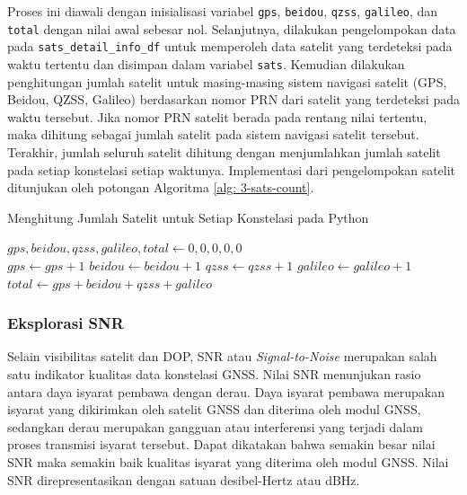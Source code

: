 Proses ini diawali dengan inisialisasi variabel \texttt{gps}, \texttt{beidou}, \texttt{qzss}, \texttt{galileo}, dan \texttt{total} dengan nilai awal sebesar nol. Selanjutnya, dilakukan pengelompokan data pada \texttt{sats\_detail\_info\_df} untuk memperoleh data satelit yang terdeteksi pada waktu tertentu dan disimpan dalam variabel \texttt{sats}. Kemudian dilakukan penghitungan jumlah satelit untuk masing-masing sistem navigasi satelit (GPS, Beidou, QZSS, Galileo) berdasarkan nomor PRN dari satelit yang terdeteksi pada waktu tersebut. Jika nomor PRN satelit berada pada rentang nilai tertentu, maka dihitung sebagai jumlah satelit pada sistem navigasi satelit tersebut. Terakhir, jumlah seluruh satelit dihitung dengan menjumlahkan jumlah satelit pada setiap konstelasi setiap waktunya. Implementasi dari pengelompokan satelit ditunjukan oleh potongan Algoritma \ref{alg: 3-sats-count}.

\begin{algorithm}[H]
	\caption{Menghitung Jumlah Satelit untuk Setiap Konstelasi pada Python}
	\label{alg: 3-sats-count}
	\begin{algorithmic}[1]
	\State $gps, beidou, qzss, galileo, total \gets 0, 0, 0, 0, 0$
	\\
	\State $gps \gets gps + 1$
	\EndIf
	\State $beidou \gets beidou + 1$
	\EndIf
	\State $qzss \gets qzss + 1$
	\EndIf
	\State $galileo \gets galileo + 1$
	\EndIf
	\State $total \gets gps + beidou + qzss + galileo$
	\EndFor
	\EndFor
	\end{algorithmic}
\end{algorithm}

\iffalse
\subsubsection{Eksplorasi SNR}
Selain visibilitas satelit dan DOP, SNR atau \textit{Signal-to-Noise} merupakan salah satu indikator kualitas data konstelasi GNSS. Nilai SNR menunjukan rasio antara daya isyarat pembawa dengan derau. Daya isyarat pembawa merupakan isyarat yang dikirimkan oleh satelit GNSS dan diterima oleh modul GNSS, sedangkan derau merupakan gangguan atau interferensi yang terjadi dalam proses transmisi isyarat tersebut. Dapat dikatakan bahwa semakin besar nilai SNR maka semakin baik kualitas isyarat yang diterima oleh modul GNSS. Nilai SNR direpresentasikan dengan satuan desibel-Hertz atau dBHz.

